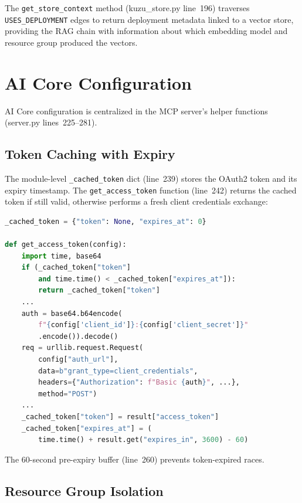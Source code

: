 \documentclass[11pt]{article}
\newcommand{\code}[1]{\texttt{#1}}
\begin{document}
The \code{get\_store\_context} method (kuzu\_store.py line~196) traverses
\code{USES\_DEPLOYMENT} edges to return deployment metadata linked to
a vector store, providing the RAG chain with information about which
embedding model and resource group produced the vectors.


\section{AI Core Configuration}
\label{sec:aicore}

AI Core configuration is centralized in the MCP server's helper
functions (server.py lines~225--281).

\subsection{Token Caching with Expiry}

The module-level \code{\_cached\_token} dict (line~239) stores the OAuth2
token and its expiry timestamp.  The \code{get\_access\_token} function
(line~242) returns the cached token if still valid, otherwise performs a
fresh client credentials exchange:

\begin{lstlisting}[language=Python,caption={Token caching (server.py lines 239--263)},label=lst:token-cache]
_cached_token = {"token": None, "expires_at": 0}

def get_access_token(config):
    import time, base64
    if (_cached_token["token"]
        and time.time() < _cached_token["expires_at"]):
        return _cached_token["token"]
    ...
    auth = base64.b64encode(
        f"{config['client_id']}:{config['client_secret']}"
        .encode()).decode()
    req = urllib.request.Request(
        config["auth_url"],
        data=b"grant_type=client_credentials",
        headers={"Authorization": f"Basic {auth}", ...},
        method="POST")
    ...
    _cached_token["token"] = result["access_token"]
    _cached_token["expires_at"] = (
        time.time() + result.get("expires_in", 3600) - 60)
\end{lstlisting}

The 60-second pre-expiry buffer (line~260) prevents token-expired races.

\subsection{Resource Group Isolation}
\end{document}
